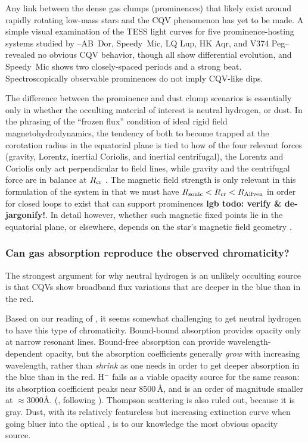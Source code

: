 \documentclass[11pt,twocolumn,tighten]{aastex63}
\begin{document}
Any link between the dense gas clumps (prominences) that likely exist
around rapidly rotating low-mass stars and the CQV phenomenon has
yet to be made.  A simple visual examination of the TESS light curves
for five prominence-hosting systems studied by
\citet{2019MNRAS.482.2853J}--AB~Dor, Speedy~Mic, LQ Lup, HK Aqr, and
V374 Peg--revealed no obvious CQV behavior, though all show
differential evolution, and Speedy~Mic shows two closely-spaced periods
and a strong beat.  Spectroscopically observable prominences 
do not imply CQV-like dips.

The difference between the prominence and dust clump scenarios is
essentially only in whether the occulting material of interest is
neutral hydrogen, or dust.  In the phrasing of the ``frozen flux''
condition of ideal rigid field magnetohydrodynamics, the tendency of
both to become trapped at the corotation radius in the equatorial
plane is tied to how of the four relevant forces (gravity, Lorentz,
inertial Coriolis, and inertial centrifugal), the Lorentz and Coriolis
only act perpendicular to field lines, while gravity and the
centrifugal force are in balance at $R_{\rm cr}$
\citep[see][Sec.~2]{2005MNRAS.357..251T}.  The magnetic field strength
is only relevant in this formulation of the system in that we must
have $R_{\rm sonic} < R_{\rm cr} < R_{\rm Alfven}$ in order for closed
loops to exist that can support prominences
\citep{2019MNRAS.482.2853J} {\bf lgb todo: verify \& de-jargonify!}.
In detail however, whether such magnetic fixed points lie in the
equatorial plane, or elsewhere, depends on the star's magnetic field
geometry \citep{2023MNRAS.518.4734S}.

\subsubsection{Can gas absorption reproduce the observed chromaticity?}
The strongest argument for why neutral hydrogen is an unlikely
occulting source is that CQVs show broadband flux variations that are
deeper in the blue than in the red.

Based on our reading of \citet[][Ch.~8]{1992oasp.book.....G}, it seems
somewhat challenging to get neutral hydrogen to have this type of
chromaticity.  Bound-bound absorption provides opacity only at narrow
resonant lines.  Bound-free absorption can provide
wavelength-dependent opacity, but the absorption coefficients
generally {\it grow} with increasing wavelength, rather than {\it
shrink} as one needs in order to get deeper absorption in the blue
than in the red.  H$^-$  fails as a viable opacity source for the same
reason: its absorption coefficient peaks near 8500\,\AA, and is an
order of magnitude smaller at $\approx$3000\AA.
(\citealt{1992oasp.book.....G}, following \citealt{1979MNRAS.187P..59W}).
Thompson scattering is also ruled out, because it is gray.  Dust, with
its relatively featureless but increasing extinction curve when going
bluer into the optical \citep{1989ApJ...345..245C}, is to our
knowledge the most obvious opacity source.
\end{document}
